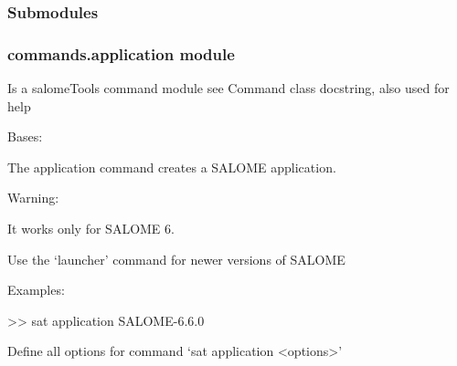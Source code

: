 \documentclass[a4paper,10pt,english]{sphinxmanual}
\begin{document}
\subsubsection{Submodules}
\label{\detokenize{apidoc_commands/commands:submodules}}

\subsubsection{commands.application module}
\label{\detokenize{apidoc_commands/commands:module-commands.application}}\label{\detokenize{apidoc_commands/commands:commands-application-module}}
Is a salomeTools command module
see Command class docstring, also used for help

\begin{fulllineitems}
\label{\detokenize{apidoc_commands/commands:commands.application.Command}}
Bases: 

The application command creates a SALOME application.

\begin{DUlineblock}{0em}
\item[] Warning:
\item[]
\begin{DUlineblock}{\DUlineblockindent}
\item[] It works only for SALOME 6.
\item[] Use the ‘launcher’ command for newer versions of SALOME
\item[] 
\end{DUlineblock}
\item[] Examples:
\item[] \textgreater{}\textgreater{} sat application SALOME-6.6.0
\end{DUlineblock}

\begin{fulllineitems}
\label{\detokenize{apidoc_commands/commands:commands.application.Command.getParser}}
Define all options for command ‘sat application \textless{}options\textgreater{}’

\end{fulllineitems}


\end{fulllineitems}
\end{document}
